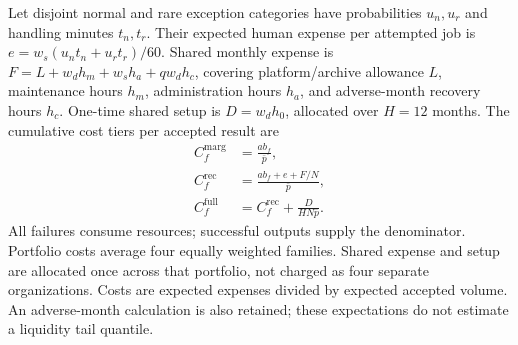 Let disjoint normal and rare exception categories have probabilities $u_n,u_r$
and handling minutes $t_n,t_r$. Their expected human expense per attempted job
is $e=w_s(u_nt_n+u_rt_r)/60$. Shared monthly expense is
$F=L+w_dh_m+w_sh_a+qw_dh_c$, covering platform/archive allowance $L$,
maintenance hours $h_m$, administration hours $h_a$, and adverse-month recovery
hours $h_c$. One-time shared setup is $D=w_dh_0$, allocated over $H=12$ months.
The cumulative cost tiers per accepted result are
\begin{align}
 C_f^{\mathrm{marg}}&=\frac{ab_f}{\bar p}, \label{eq:ec-marginal}\\
 C_f^{\mathrm{rec}}&=\frac{ab_f+e+F/N}{\bar p}, \label{eq:ec-recurring}\\
 C_f^{\mathrm{full}}&=C_f^{\mathrm{rec}}+
              \frac{D}{HN\bar p}. \label{eq:ec-full}
\end{align}
All failures consume resources; successful outputs supply the denominator.
Portfolio costs average four equally weighted families. Shared expense and
setup are allocated once across that portfolio, not charged as four separate
organizations. Costs are expected expenses divided by expected accepted
volume. An adverse-month calculation is also retained; these expectations do
not estimate a liquidity tail quantile.

